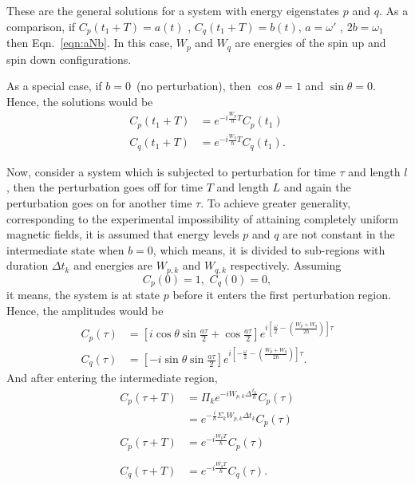 These are the general solutions for a system with energy eigenstates
$p$ and $q$.  As a comparison, if $C_p(t_1+T)=a(t)$ ,
$C_q(t_1+T)=b(t)$, $a= \omega'$ , $2b=\omega_1$ then
Eqn.~\ref{eqn:aNb}. In this case, $W_p$ and $W_q$ are energies of the
spin up and spin down configurations.

As a special case, if $b=0$~(no perturbation), then $\cos \theta=1$ and
$\sin \theta=0$. Hence, the solutions would be
\begin{align}
C_p(t_1+T) &= e^{-i \frac{W_p}{\hbar} T} C_p(t_1) \\ \nonumber
C_q(t_1+T) &=e^{-i \frac{W_q}{\hbar}T} C_q(t_1).
\end{align}

Now, consider a system which is subjected to perturbation for time
$\tau$ and length $l$, then the perturbation goes off for time $T$ and
length $L$ and again the perturbation goes on for another time
$\tau$. To achieve greater generality, corresponding to the
experimental impossibility of attaining completely uniform magnetic
fields, it is assumed that energy levels $p$ and $q$ are not constant in
the intermediate state when $b=0$, which means, it is divided to
sub-regions with duration $\Delta t_k$ and energies are $W_{p,k}$ and
$W_{q,k}$ respectively. Assuming
\begin{equation}
C_p(0)=1 , \, \, C_q(0)=0 ,
\end{equation}
it means, the system is at state $p$ before it enters the first
perturbation region. Hence, the amplitudes would be
\begin{align}
C_p(\tau) &=\left[i \cos \theta \sin \frac{a\tau}{2}+ \cos \frac{a\tau}{2}\right]
e^{i\left[\frac{\omega}{2}-\left(\frac{W_p+W_q}{2\hbar}\right)\right]\tau}\\ \nonumber
C_q(\tau) &=\left[ -i \sin \theta \sin \frac{a\tau}{2} \right] 
e^{i \left[ -\frac{\omega}{2} - \left( \frac{W_p+W_q}{2\hbar}\right)\right]\tau} .
\end{align}
And after entering the intermediate region,
\begin{align}
C_p(\tau+T)&=\Pi_k e^{-i W_{p,k} \Delta \frac{t_k}{\hbar}}  C_p(\tau)\nonumber \\
&=e^{-\frac{i}{\hbar} \Sigma_k W_{p,k} \Delta t_k}  C_p(\tau) \nonumber\\
C_p(\tau+T)&=e^{-i \frac{\bar{W_p}T}{\hbar}} C_p(\tau) \\
\nonumber\\
C_q(\tau+T)&=e^{-i \frac{\bar{W_q}T}{\hbar}} C_q(\tau) .
\end{align}

